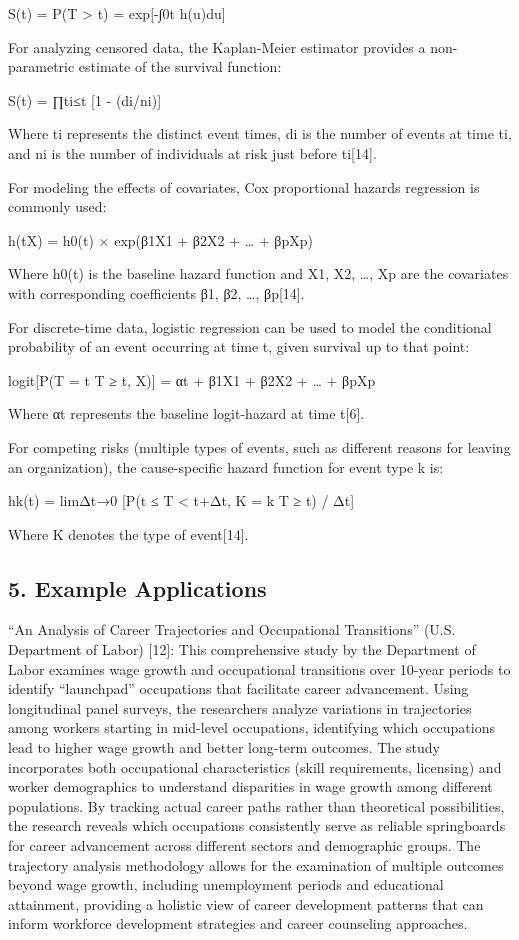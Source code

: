 \documentclass[
  letterpaper,
  DIV=11,
  numbers=noendperiod]{scrartcl}
\begin{document}
S(t) = P(T \textgreater{} t) = exp{[}-∫0t h(u)du{]}

For analyzing censored data, the Kaplan-Meier estimator provides a
non-parametric estimate of the survival function:

S(t) = ∏ti≤t {[}1 - (di/ni){]}

Where ti represents the distinct event times, di is the number of events
at time ti, and ni is the number of individuals at risk just before
ti{[}14{]}.

For modeling the effects of covariates, Cox proportional hazards
regression is commonly used:

h(t\textbar X) = h0(t) × exp(β1X1 + β2X2 + \ldots{} + βpXp)

Where h0(t) is the baseline hazard function and X1, X2, \ldots, Xp are
the covariates with corresponding coefficients β1, β2, \ldots,
βp{[}14{]}.

For discrete-time data, logistic regression can be used to model the
conditional probability of an event occurring at time t, given survival
up to that point:

logit{[}P(T = t \textbar{} T ≥ t, X){]} = αt + β1X1 + β2X2 + \ldots{} +
βpXp

Where αt represents the baseline logit-hazard at time t{[}6{]}.

For competing risks (multiple types of events, such as different reasons
for leaving an organization), the cause-specific hazard function for
event type k is:

hk(t) = limΔt→0 {[}P(t ≤ T \textless{} t+Δt, K = k \textbar{} T ≥ t) /
Δt{]}

Where K denotes the type of event{[}14{]}.

\subsection{5. Example Applications}\label{example-applications}

``An Analysis of Career Trajectories and Occupational Transitions''
(U.S. Department of Labor) {[}12{]}: This comprehensive study by the
Department of Labor examines wage growth and occupational transitions
over 10-year periods to identify ``launchpad'' occupations that
facilitate career advancement. Using longitudinal panel surveys, the
researchers analyze variations in trajectories among workers starting in
mid-level occupations, identifying which occupations lead to higher wage
growth and better long-term outcomes. The study incorporates both
occupational characteristics (skill requirements, licensing) and worker
demographics to understand disparities in wage growth among different
populations. By tracking actual career paths rather than theoretical
possibilities, the research reveals which occupations consistently serve
as reliable springboards for career advancement across different sectors
and demographic groups. The trajectory analysis methodology allows for
the examination of multiple outcomes beyond wage growth, including
unemployment periods and educational attainment, providing a holistic
view of career development patterns that can inform workforce
development strategies and career counseling approaches.
\end{document}
